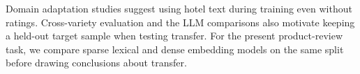 Domain adaptation studies suggest using hotel text during training even
without ratings. Cross-variety evaluation and the LLM comparisons also
motivate keeping a held-out target sample when testing transfer. For the
present product-review task, we compare sparse lexical and dense embedding
models on the same split before drawing conclusions about transfer.
